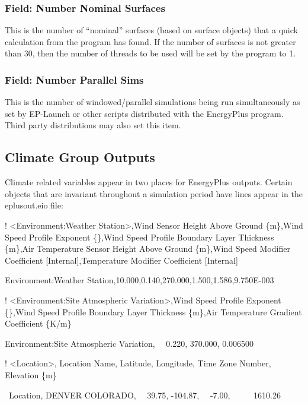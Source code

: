 \subsubsection{Field: Number Nominal Surfaces}\label{field-number-nominal-surfaces}

This is the number of ``nominal'' surfaces (based on surface objects) that a quick calculation from the program has found. If the number of surfaces is not greater than 30, then the number of threads to be used will be set by the program to 1.

\subsubsection{Field: Number Parallel Sims}\label{field-number-parallel-sims}

This is the number of windowed/parallel simulations being run simultaneously as set by EP-Launch or other scripts distributed with the EnergyPlus program. Third party distributions may also set this item.

\subsection{Climate Group Outputs}\label{climate-group-outputs}

Climate related variables appear in two places for EnergyPlus outputs. Certain objects that are invariant throughout a simulation period have lines appear in the eplusout.eio file:

! \textless{}Environment:Weather Station\textgreater{},Wind Sensor Height Above Ground \{m\},Wind Speed Profile Exponent \{\},Wind Speed Profile Boundary Layer Thickness \{m\},Air Temperature Sensor Height Above Ground \{m\},Wind Speed Modifier Coefficient {[}Internal{]},Temperature Modifier Coefficient {[}Internal{]}

Environment:Weather Station,10.000,0.140,270.000,1.500,1.586,9.750E-003

! \textless{}Environment:Site Atmospheric Variation\textgreater{},Wind Speed Profile Exponent \{\},Wind Speed Profile Boundary Layer Thickness \{m\},Air Temperature Gradient Coefficient \{K/m\}

Environment:Site Atmospheric Variation,~~ 0.220, 370.000, 0.006500

! \textless{}Location\textgreater{}, Location Name, Latitude, Longitude, Time Zone Number, Elevation \{m\}

~Location, DENVER COLORADO,~~ 39.75, -104.87,~~ -7.00,~~~~~ 1610.26

